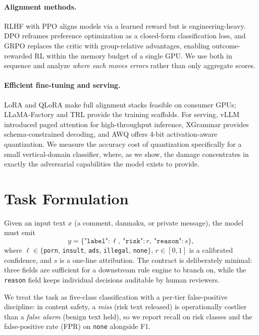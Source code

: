 \documentclass[11pt]{article}
\begin{document}
\paragraph{Alignment methods.}
RLHF with PPO \citep{schulman2017ppo} aligns models via a learned reward but is engineering-heavy. DPO \citep{rafailov2023dpo} reframes preference optimization as a closed-form classification loss, and GRPO \citep{shao2024deepseekmath} replaces the critic with group-relative advantages, enabling outcome-rewarded RL within the memory budget of a single GPU. We use both in sequence and analyze \emph{where each moves errors} rather than only aggregate scores.

\paragraph{Efficient fine-tuning and serving.}
LoRA \citep{hu2022lora} and QLoRA \citep{dettmers2023qlora} make full alignment stacks feasible on consumer GPUs; LLaMA-Factory \citep{zheng2024llamafactory} and TRL \citep{vonwerra2020trl} provide the training scaffolds. For serving, vLLM \citep{kwon2023vllm} introduced paged attention for high-throughput inference, XGrammar \citep{dong2024xgrammar} provides schema-constrained decoding, and AWQ \citep{lin2024awq} offers 4-bit activation-aware quantization. We measure the accuracy cost of quantization specifically for a small vertical-domain classifier, where, as we show, the damage concentrates in exactly the adversarial capabilities the model exists to provide.

\section{Task Formulation}

Given an input text $x$ (a comment, danmaku, or private message), the model must emit
\begin{equation}
y = \{\texttt{"label"}: \ell,\ \texttt{"risk"}: r,\ \texttt{"reason"}: s\},
\end{equation}
where $\ell \in \{$\texttt{porn}, \texttt{insult}, \texttt{ads}, \texttt{illegal}, \texttt{none}$\}$, $r \in [0,1]$ is a calibrated confidence, and $s$ is a one-line attribution. The contract is deliberately minimal: three fields are sufficient for a downstream rule engine to branch on, while the \texttt{reason} field keeps individual decisions auditable by human reviewers.

We treat the task as five-class classification with a per-tier false-positive discipline: in content safety, a \emph{miss} (risk text released) is operationally costlier than a \emph{false alarm} (benign text held), so we report recall on risk classes and the false-positive rate (FPR) on \texttt{none} alongside F1.
\end{document}
